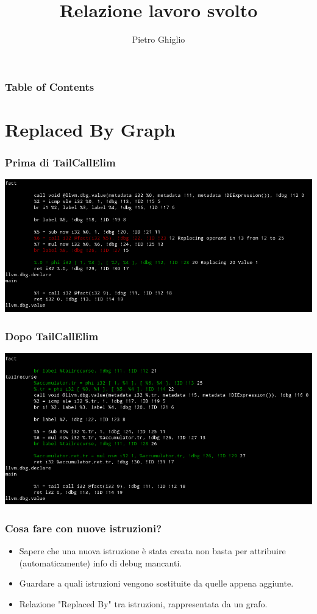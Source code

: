 \documentclass{beamer}
\title{Relazione lavoro svolto}
\author{Pietro Ghiglio}
\begin{document}
\titlepage

\begin{frame}
\frametitle{Table of Contents}
\tableofcontents
\end{frame}


\section{Replaced By Graph}

\begin{frame}
\frametitle{Prima di TailCallElim}
\includegraphics[scale=0.4]{fact_old.png}
\end{frame}

\begin{frame}
\frametitle{Dopo TailCallElim}
\includegraphics[scale=0.5]{fact.png}
\end{frame}

\begin{frame}
\frametitle{Cosa fare con nuove istruzioni?}
\begin{itemize}
\item Sapere che una nuova istruzione è stata creata non basta per attribuire (automaticamente) info di debug mancanti.
\item Guardare a quali istruzioni vengono sostituite da quelle appena aggiunte.
\item Relazione "Replaced By" tra istruzioni, rappresentata da un grafo.
\end{itemize}

\end{frame}
\end{document}
